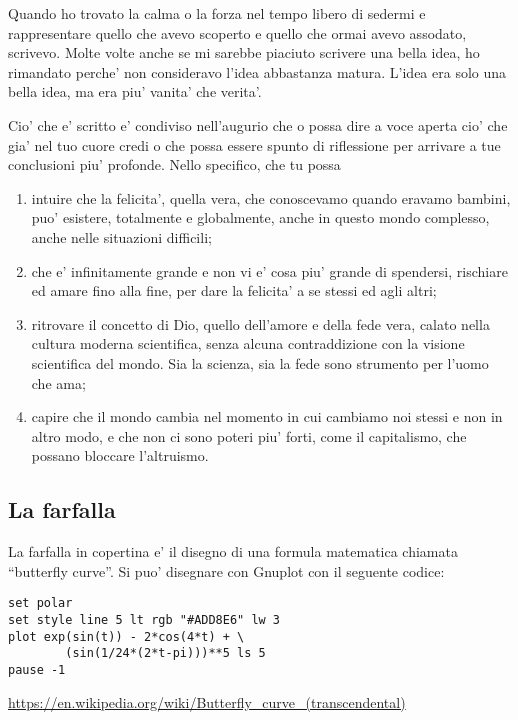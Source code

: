 Quando ho trovato la calma o la forza nel tempo libero di sedermi e rappresentare quello che avevo scoperto e quello che ormai avevo assodato, scrivevo. Molte volte anche se mi sarebbe piaciuto scrivere una bella idea, ho rimandato perche' non consideravo l'idea abbastanza matura. L'idea era solo una bella idea, ma era piu' vanita' che verita'. 

Cio' che e' scritto e' condiviso nell'augurio che o possa dire a voce aperta cio' che gia' nel tuo cuore credi o che possa essere spunto di riflessione per arrivare a tue conclusioni piu' profonde. Nello specifico, che tu possa 
\begin{enumerate}
    \item intuire che la felicita', quella vera, che conoscevamo quando eravamo bambini, puo' esistere, totalmente e globalmente, anche in questo mondo complesso, anche nelle situazioni difficili;
    \item che e' infinitamente grande e non vi e' cosa piu' grande di spendersi, rischiare ed amare fino alla fine, per dare la felicita' a se stessi ed agli altri;
    \item ritrovare il concetto di Dio, quello dell'amore e della fede vera, calato nella cultura moderna scientifica, senza alcuna contraddizione con la visione scientifica del mondo. Sia la scienza, sia la fede sono strumento per l'uomo che ama;
    \item capire che il mondo cambia nel momento in cui cambiamo noi stessi e non in altro modo, e che non ci sono poteri piu' forti, come il capitalismo, che possano bloccare l'altruismo.
\end{enumerate}


\subsection{La farfalla}

La farfalla in copertina e' il disegno di una formula matematica chiamata ``butterfly curve''. Si puo' disegnare con Gnuplot con il seguente codice:
\begin{verbatim}
set polar
set style line 5 lt rgb "#ADD8E6" lw 3
plot exp(sin(t)) - 2*cos(4*t) + \
        (sin(1/24*(2*t-pi)))**5 ls 5
pause -1
\end{verbatim}
\url{https://en.wikipedia.org/wiki/Butterfly\_curve\_(transcendental)}
